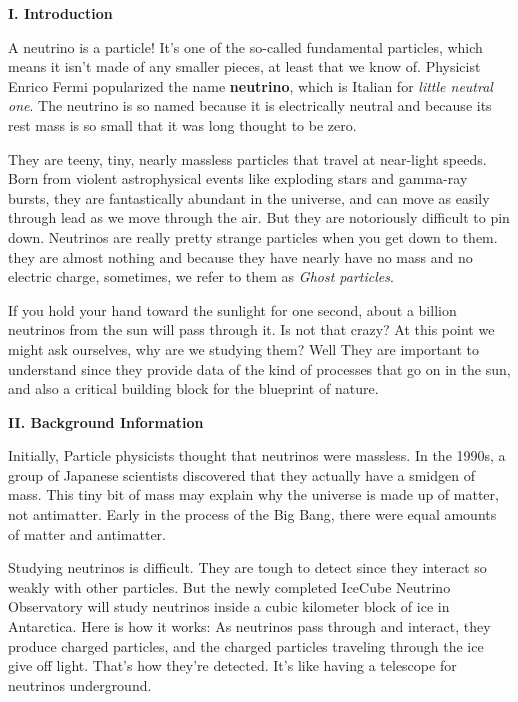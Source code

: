 \documentclass[fleqn]{article}
\begin{document}
  \pagebreak

  \textbf{I. Introduction}

  \vspace{10px}

  A neutrino is a particle! It’s one of the so-called fundamental particles, which means it isn’t made of any 
  smaller pieces, at least that we know of. Physicist Enrico Fermi popularized the name \textbf{neutrino}, 
  which is Italian for \emph{little neutral one}. The neutrino is so named because it is electrically neutral 
  and because its rest mass is so small that it was long thought to be zero.

  They are teeny, tiny, nearly massless particles that travel at near-light speeds. Born from violent astrophysical events 
  like exploding stars and gamma-ray bursts, they are fantastically abundant in the universe, and can move as easily through 
  lead as we move through the air. But they are notoriously difficult to pin down. Neutrinos are really pretty strange particles 
  when you get down to them. they are almost nothing and because they have nearly have no mass and no electric charge, sometimes, 
  we refer to them as \emph{Ghost particles}.

  If you hold your hand toward the sunlight for one second, about a billion neutrinos from the sun will pass through it. Is not that crazy? 
  At this point we might ask ourselves, why are we studying them? Well They are important to understand since they provide data of the kind 
  of processes that go on in the sun, and also a critical building block for the blueprint of nature.

  \vspace{20px}

  \textbf{II. Background Information}

  \vspace{10px}

  Initially, Particle physicists thought that neutrinos were massless. In the 1990s, a group of Japanese scientists discovered that they 
  actually have a smidgen of mass. This tiny bit of mass may explain why the universe is made up of matter, not antimatter. Early in the 
  process of the Big Bang, there were equal amounts of matter and antimatter.

  Studying neutrinos is difficult. They are tough to detect since they interact so weakly with other particles. But the newly completed 
  IceCube Neutrino Observatory will study neutrinos inside a cubic kilometer block of ice in Antarctica. Here is how it works: 
  As neutrinos pass through and interact, they produce charged particles, and the charged particles traveling through the ice give off light.
  That’s how they’re detected. It’s like having a telescope for neutrinos underground.
\end{document}
